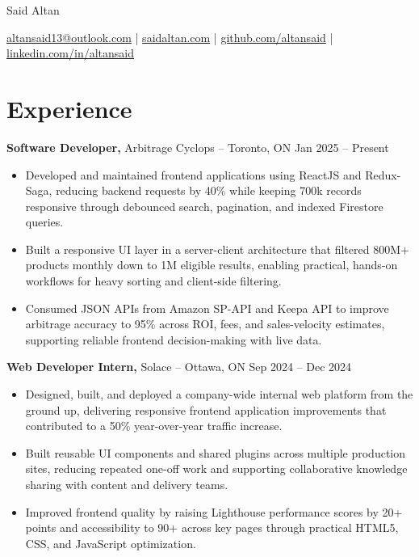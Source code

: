 \documentclass[11pt]{article}       %
\begin{document}
\centerline{\Huge Said Altan}

\vspace{10pt}

\centerline{\href{mailto:altansaid13@outlook.com}{altansaid13@outlook.com} | \href{https://saidaltan.com}{saidaltan.com} | \href{https://github.com/altansaid}{github.com/altansaid} | \href{https://www.linkedin.com/in/altansaid}{linkedin.com/in/altansaid}}


\vspace{5pt}
\section*{Experience}
\textbf{Software Developer,} {Arbitrage Cyclops} -- Toronto, ON \hfill Jan 2025 -- Present \\
\vspace{-9pt}
\begin{itemize}
  \item Developed and maintained frontend applications using ReactJS and Redux-Saga, reducing backend requests by 40\% while keeping 700k records responsive through debounced search, pagination, and indexed Firestore queries.
  \item Built a responsive UI layer in a server-client architecture that filtered 800M+ products monthly down to 1M eligible results, enabling practical, hands-on workflows for heavy sorting and client-side filtering.
  \item Consumed JSON APIs from Amazon SP-API and Keepa API to improve arbitrage accuracy to 95\% across ROI, fees, and sales-velocity estimates, supporting reliable frontend decision-making with live data.
\end{itemize}

\textbf{Web Developer Intern,} {Solace} -- Ottawa, ON \hfill Sep 2024 -- Dec 2024 \\
\vspace{-9pt}
\begin{itemize}
  \item Designed, built, and deployed a company-wide internal web platform from the ground up, delivering responsive frontend application improvements that contributed to a 50\% year-over-year traffic increase.
  \item Built reusable UI components and shared plugins across multiple production sites, reducing repeated one-off work and supporting collaborative knowledge sharing with content and delivery teams.
  \item Improved frontend quality by raising Lighthouse performance scores by 20+ points and accessibility to 90+ across key pages through practical HTML5, CSS, and JavaScript optimization.
\end{itemize}
\end{document}
